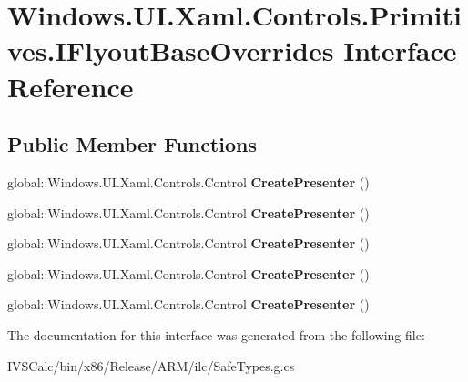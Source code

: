 \hypertarget{interface_windows_1_1_u_i_1_1_xaml_1_1_controls_1_1_primitives_1_1_i_flyout_base_overrides}{}\section{Windows.\+U\+I.\+Xaml.\+Controls.\+Primitives.\+I\+Flyout\+Base\+Overrides Interface Reference}
\label{interface_windows_1_1_u_i_1_1_xaml_1_1_controls_1_1_primitives_1_1_i_flyout_base_overrides}
\subsection*{Public Member Functions}
\begin{DoxyCompactItemize}
\item 
\mbox{\label{interface_windows_1_1_u_i_1_1_xaml_1_1_controls_1_1_primitives_1_1_i_flyout_base_overrides_a3de476f9e60fa2a1faaf71948f4eae03}} 
global\+::\+Windows.\+U\+I.\+Xaml.\+Controls.\+Control {\bfseries Create\+Presenter} ()
\item 
\mbox{\label{interface_windows_1_1_u_i_1_1_xaml_1_1_controls_1_1_primitives_1_1_i_flyout_base_overrides_a3de476f9e60fa2a1faaf71948f4eae03}} 
global\+::\+Windows.\+U\+I.\+Xaml.\+Controls.\+Control {\bfseries Create\+Presenter} ()
\item 
\mbox{\label{interface_windows_1_1_u_i_1_1_xaml_1_1_controls_1_1_primitives_1_1_i_flyout_base_overrides_a3de476f9e60fa2a1faaf71948f4eae03}} 
global\+::\+Windows.\+U\+I.\+Xaml.\+Controls.\+Control {\bfseries Create\+Presenter} ()
\item 
\mbox{\label{interface_windows_1_1_u_i_1_1_xaml_1_1_controls_1_1_primitives_1_1_i_flyout_base_overrides_a3de476f9e60fa2a1faaf71948f4eae03}} 
global\+::\+Windows.\+U\+I.\+Xaml.\+Controls.\+Control {\bfseries Create\+Presenter} ()
\item 
\mbox{\label{interface_windows_1_1_u_i_1_1_xaml_1_1_controls_1_1_primitives_1_1_i_flyout_base_overrides_a3de476f9e60fa2a1faaf71948f4eae03}} 
global\+::\+Windows.\+U\+I.\+Xaml.\+Controls.\+Control {\bfseries Create\+Presenter} ()
\end{DoxyCompactItemize}


The documentation for this interface was generated from the following file\+:\begin{DoxyCompactItemize}
\item 
I\+V\+S\+Calc/bin/x86/\+Release/\+A\+R\+M/ilc/Safe\+Types.\+g.\+cs\end{DoxyCompactItemize}
